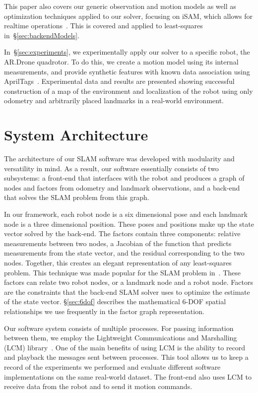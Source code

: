 \documentclass[conference]{IEEEtran}
\begin{document}
This paper also covers our generic observation and motion models as well as optimization
techniques applied to our solver, focusing on iSAM, which allows for realtime
operations~\cite{Kaess08tro}.  This is covered and applied to least-squares
in~\S\ref{sec:backendModels}.

In~\S\ref{sec:experiments}, we experimentally apply our solver to a specific robot, the
AR.Drone quadrotor.  To do this, we create a motion model using its internal measurements,
and provide synthetic features with known data association using
AprilTags~\cite{olson2011tags}.  Experimental data and results are presented showing
successful construction of a map of the environment and localization of the robot using
only odometry and arbitrarily placed landmarks in a real-world environment.

\section{System Architecture}
\label{sec:systemarchitecture}


The architecture of our \ac{SLAM} software was developed with modularity and versatility
in mind.  As a result, our software essentially consists of two subsystems: a
front-end that interfaces with the robot and produces a graph of nodes and factors from
odometry and landmark observations, and a back-end that solves the \ac{SLAM} problem from
this graph.

In our framework, each robot node is a six dimensional pose and each landmark node is a
three dimensional position. These poses and positions make up the state vector solved by
the back-end.  The factors contain three components: relative measurements between two
nodes, a Jacobian of the function that predicts measurements from the state vector, and
the residual corresponding to the two nodes.  Together, this creates an elegant
representation of any least-squares problem.  This technique was made popular for the
\ac{SLAM} problem in~\cite{dellaert2005square}.  These factors can relate two robot nodes,
or a landmark node and a robot node.  Factors are the constraints that the back-end
\ac{SLAM} solver uses to optimize the estimate of the state vector. \S\ref{sec:6dof}
describes the mathematical 6-\ac{DOF} spatial relationships we use frequently in the
factor graph representation.


Our software system consists of multiple processes.  For passing information between them,
we employ the Lightweight Communications and Marshalling (LCM)
library~\cite{huang2010}. One of the main benefits of using LCM is the ability to record
and playback the messages sent between processes. This tool allows us to keep a record of
the experiments we performed and evaluate different software implementations on the same
real-world dataset. The front-end also uses LCM to receive data from the robot and to send
it motion commands.
\end{document}
